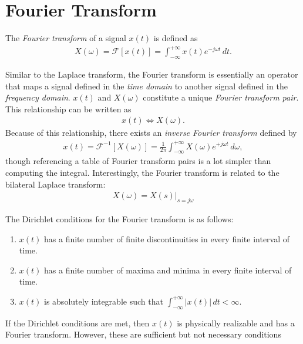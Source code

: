 \documentclass{report}
\begin{document}
\section{Fourier Transform}
\begin{tcolorbox}[width=\textwidth,colback={white}, sharp corners]
    The \emph{Fourier transform} of a signal $x(t)$ is defined as 
    \begin{align}
        X(\omega) = \mathcal{F}[x(t)] = \int_{-\infty}^{+\infty} x(t) e^{-j\omega t} \,dt.
    \end{align}
\end{tcolorbox}
Similar to the Laplace transform, the Fourier transform is essentially an operator that maps a signal defined in the \emph{time domain} to another signal defined 
in the \emph{frequency domain}. $x(t)$ and $X(\omega)$ constitute a unique \emph{Fourier transform pair}. This relationship can be written as 
\begin{align}
    x(t) \iff X(\omega).
\end{align}
Because of this relationship, there exists an \emph{inverse Fourier transform} defined by
\begin{align}
    x(t) = \mathcal{F}^{-1}[X(\omega)] = \frac{1}{2\pi}\int_{-\infty}^{+\infty} X(\omega) e^{+j\omega t} \,d\omega,
\end{align}
though referencing a table of Fourier transform pairs is a lot simpler than computing the integral. 
Interestingly, the Fourier transform is related to the bilateral Laplace transform:
\begin{align}
    X(\omega) = X(s)\big|_{s=j\omega}
\end{align}
\begin{tcolorbox}[width=\textwidth,colback={white}, sharp corners]
    The Dirichlet conditions for the Fourier transform is as follows:
    \begin{enumerate}
        \item $x(t)$ has a finite number of finite discontinuities in every finite interval of time.
        \item $x(t)$ has a finite number of maxima and minima in every finite interval of time.
        \item $x(t)$ is absolutely integrable such that $\displaystyle\int_{-\infty}^{+\infty}|x(t)| \,dt < \infty$.
    \end{enumerate}
\end{tcolorbox}
\noindent If the Dirichlet conditions are met, then $x(t)$ is physically realizable and has a Fourier transform. However, these are sufficient but not necessary conditions 
\end{document}
